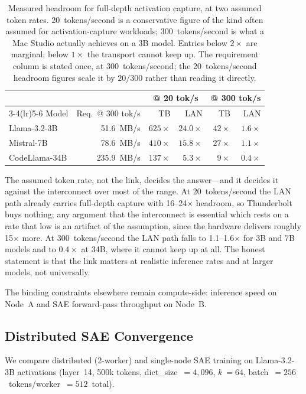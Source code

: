 \documentclass[11pt]{article}
\begin{document}
\begin{table}[h]
\centering
\caption{Measured headroom for full-depth activation capture, at two assumed token
rates. 20~tokens/second is a conservative figure of the kind often assumed for
activation-capture workloads; 300~tokens/second is what a Mac Studio actually achieves
on a 3B model. Entries below $2\times$ are marginal; below $1\times$ the transport
cannot keep up. The requirement column is stated once, at 300~tokens/second; the
20~tokens/second headroom figures scale it by $20/300$ rather than reading it directly.}
\label{tab:tb4}
\begin{tabular}{@{}lrrrrr@{}}
\toprule
& & \multicolumn{2}{c}{@ 20 tok/s} & \multicolumn{2}{c}{@ 300 tok/s} \\
\cmidrule(lr){3-4}\cmidrule(lr){5-6}
Model & Req.\ @ 300 tok/s & TB & LAN & TB & LAN \\
\midrule
Llama-3.2-3B  &  51.6~MB/s & $625\times$ & $24.0\times$ & $42\times$ & $1.6\times$ \\
Mistral-7B    &  78.6~MB/s & $410\times$ & $15.8\times$ & $27\times$ & $1.1\times$ \\
CodeLlama-34B & 235.9~MB/s & $137\times$ &  $5.3\times$ &  $9\times$ & $0.4\times$ \\
\bottomrule
\end{tabular}
\end{table}

The assumed token rate, not the link, decides the answer---and it decides it against
the interconnect over most of the range. At 20~tokens/second the LAN path already carries
full-depth capture with 16--24$\times$ headroom, so Thunderbolt buys nothing; any argument
that the interconnect is essential which rests on a rate that low is an artifact of the
assumption, since the hardware delivers roughly 15$\times$ more. At 300~tokens/second
the LAN path falls to 1.1--1.6$\times$ for 3B and 7B models and to $0.4\times$ at 34B,
where it cannot keep up at all. The honest statement is that the link matters at
realistic inference rates and at larger models, not universally.

The binding constraints elsewhere remain compute-side: inference speed on Node~A and
SAE forward-pass throughput on Node~B.

\subsection{Distributed SAE Convergence}

We compare distributed (2-worker) and single-node SAE training on Llama-3.2-3B activations (layer~14, 500k tokens, dict\_size~$= 4{,}096$, $k~= 64$, batch~$= 256$~tokens/worker~$= 512$~total).
\end{document}

